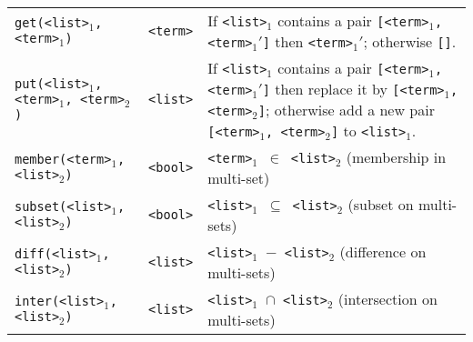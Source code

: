 \documentclass[a4,twoside,noweb]{article} %
\begin{document}
\begin{tabular}{|l|l|p{8cm}|}
 {\tt get(<list>$_1$,<term>$_1$)}       & {\tt <term>}   & If {\tt <list>$_1$} contains a pair
                                                           {\tt [<term>$_1$, <term>$_1'$]} then {\tt <term>$_1'$};
                                                           otherwise {\tt []}.\\
 {\tt put(<list>$_1$,<term>$_1$, <term>$_2$)}   & {\tt <list>}   & If {\tt <list>$_1$} contains a pair
                                                           {\tt [<term>$_1$, <term>$_1'$]} then replace it by
                                                           {\tt [<term>$_1$, <term>$_2$]}; otherwise add a new pair     
                                                           {\tt [<term>$_1$, <term>$_2$]} to {\tt <list>$_1$}. \\ \hline


 {\tt member(<term>$_1$,<list>$_2$)}    & {\tt  <bool>}  & {\tt <term>$_1$ $\in$ <list>$_2$} (membership in multi-set)\\
 {\tt subset(<list>$_1$, <list>$_2$)}   & {\tt  <bool>}  & {\tt <list>$_1$ $\subseteq$ <list>$_2$} (subset on multi-sets)\\
 {\tt diff(<list>$_1$, <list>$_2$)}     & {\tt  <list>}  & {\tt <list>$_1$ $-$ <list>$_2$} (difference on multi-sets)\\
 {\tt inter(<list>$_1$, <list>$_2$)}    & {\tt  <list>}  & {\tt <list>$_1$ $\cap$ <list>$_2$} (intersection on multi-sets)\\ \hline
\end{tabular}
\end{document}
